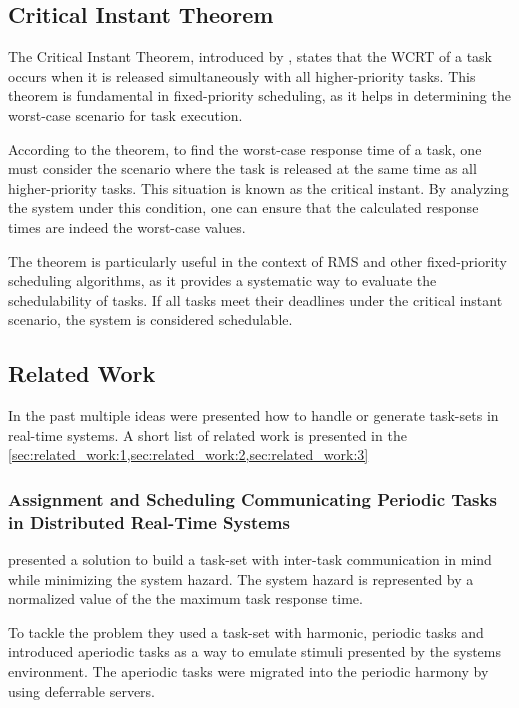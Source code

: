 \subsection{Critical Instant Theorem}\label{sec:critical_instant_theorem}
The Critical Instant Theorem, introduced by \textcite{liuSchedulingAlgorithmsMultiprogramming1973}, states that the \ac{WCRT} of a task occurs when it is released simultaneously with all higher-priority tasks.
This theorem is fundamental in fixed-priority scheduling, as it helps in determining the worst-case scenario for task execution.

According to the theorem, to find the worst-case response time of a task, one must consider the scenario where the task is released at the same time as all higher-priority tasks. 
This situation is known as the critical instant. By analyzing the system under this condition, one can ensure that the calculated response times are indeed the worst-case values.

The theorem is particularly useful in the context of \ac{RMS} and other fixed-priority scheduling algorithms, as it provides a systematic way to evaluate the schedulability of tasks. 
If all tasks meet their deadlines under the critical instant scenario, the system is considered schedulable.

\subsection{Related Work}\label{sec:related_work}
In the past multiple ideas were presented how to handle or generate task-sets in real-time systems.
A short list of related work is presented in the \cref{sec:related_work:1,sec:related_work:2,sec:related_work:3}

\subsubsection{Assignment and Scheduling Communicating Periodic Tasks in Distributed Real-Time Systems}\label{sec:related_work:1}
\textcite{dar-tzenpengAssignmentSchedulingCommunicating1997} presented a solution to build a task-set with inter-task communication in mind while minimizing the system hazard.
The system hazard is represented by a normalized value of the the maximum task response time.

To tackle the problem they used a task-set with harmonic, periodic tasks and introduced aperiodic tasks as a way to emulate stimuli presented by the systems environment.
The aperiodic tasks were migrated into the periodic harmony by using deferrable servers.

